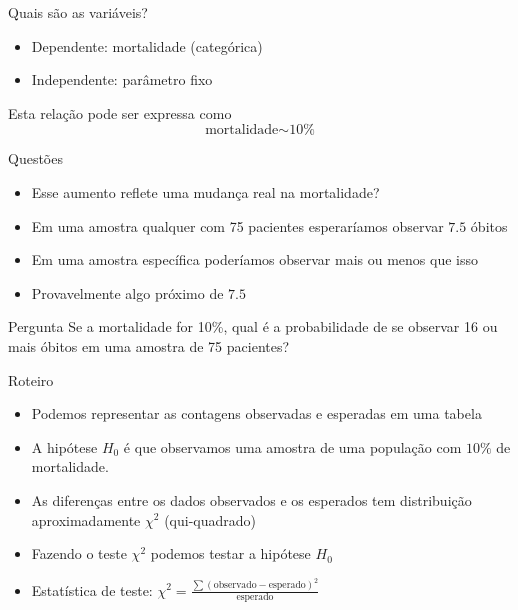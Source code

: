 \documentclass{beamer}
\begin{document}
\begin{frame}{Quais são as variáveis?}
  \begin{itemize}
    \small
  \item Dependente: mortalidade (categórica)
  \item Independente: parâmetro fixo
  \end{itemize}
  \vfill
  \begin{block}{Esta relação pode ser expressa como}
    \begin{displaymath}
      \text{mortalidade} \sim \text{10\%}
    \end{displaymath}
  \end{block}
\end{frame}

\begin{frame}{Questões}
  \begin{itemize}
  \item Esse aumento reflete uma mudança real na mortalidade?
  \item Em uma amostra qualquer com 75 pacientes esperaríamos observar $7.5$ óbitos
  \item Em uma amostra específica poderíamos observar mais ou menos
    que isso
  \item Provavelmente algo próximo de $7.5$
  \end{itemize}

  \begin{block}{Pergunta}
    Se a mortalidade for 10\%, qual é a probabilidade de se observar
    16 ou mais óbitos em uma amostra de 75 pacientes?
  \end{block}
\end{frame}

\begin{frame}{Roteiro}
  \begin{itemize}
  \item Podemos representar as contagens observadas e esperadas em uma tabela
  \item A hipótese $H_0$ é que \alert{observamos uma amostra de uma
      população com $10\%$ de mortalidade}.
  \item As diferenças entre os dados observados e os esperados tem
    distribuição aproximadamente $\chi^2$ (qui-quadrado)
  \item Fazendo o teste $\chi^2$ podemos testar a hipótese $H_0$
  \item Estatística de teste: $\chi^2 = \frac{\sum (\text{observado} - \text{esperado})^2 }{\text{esperado}}$
  \end{itemize}
\end{frame}
\end{document}
